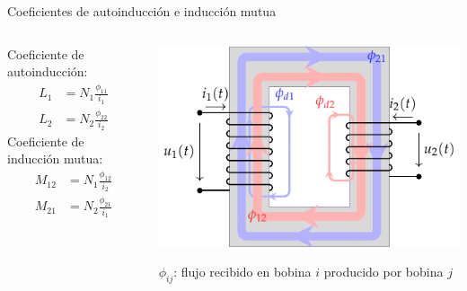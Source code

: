 \documentclass[aspectratio=169, usenames,svgnames,dvipsnames]{beamer}
\begin{document}
\begin{frame}[label={sec:orgeb727b5}]{Coeficientes de autoinducción e inducción mutua}
\begin{columns}
\begin{column}{0.4\columnwidth}
Coeficiente de autoinducción:
\begin{align*}
  L_1 &= N_1 \frac{\phi_{11}}{i_1}\\
  L_2 &= N_2 \frac{\phi_{22}}{i_2}
\end{align*}
Coeficiente de inducción mutua:
\begin{align*}
  M_{12} &= N_1 \frac{\phi_{12}}{i_2}\\
  M_{21} &= N_2 \frac{\phi_{21}}{i_1}
\end{align*}
\end{column}
\begin{column}{0.6\columnwidth}
\begin{center}
\includegraphics[height=0.7\textheight]{../figs/acoplamientoTikz.pdf}
\end{center}

\begin{center}
\(\phi_{ij}\): flujo recibido en bobina \(i\) producido por bobina \(j\)
\end{center}
\end{column}
\end{columns}
\end{frame}
\end{document}
